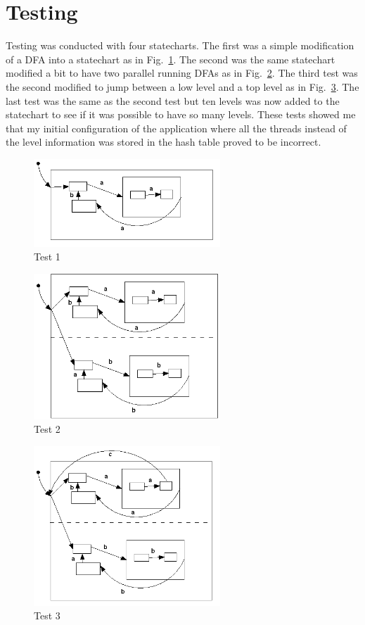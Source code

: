 \documentclass[a4paper,11pt,titlepage]{article}
\begin{document}
\section{Testing}
Testing was conducted with four statecharts. The first was a simple modification of a DFA into a statechart as in Fig.~\ref{Figure:test1}.
The second was the same statechart modified a bit to have two parallel running DFAs as in Fig.~\ref{Figure:test2}.
The third test was the second modified to jump between a low level and a top level as in Fig.~\ref{Figure:test3}.
The last test was the same as the second test but ten levels was now added to the statechart to see if it was possible to have so many levels. These tests showed me that my initial configuration of the application where all the threads instead of the level information was stored in the hash table proved to be incorrect.

\begin{figure}[htbp]
   \centering
   \includegraphics[width=7cm]{state.png}
   \caption{Test 1}
   \label{Figure:test1}
\end{figure}

\begin{figure}[htbp]
   \centering
   \includegraphics[width=7cm]{test2.png}
   \caption{Test 2}
   \label{Figure:test2}
\end{figure}

\begin{figure}[htbp]
   \centering
   \includegraphics[width=7cm]{test3.png}
   \caption{Test 3}
   \label{Figure:test3}
\end{figure}
\newpage
\end{document}
